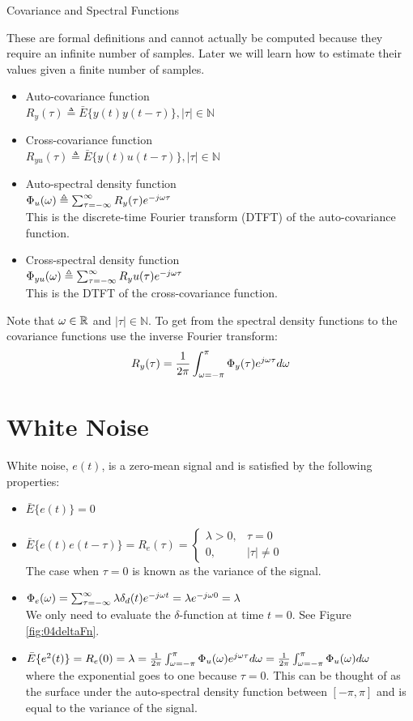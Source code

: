 \begin{definition}{Covariance and Spectral Functions}

These are formal definitions and cannot actually be computed because they require an infinite number of samples. Later we will learn how to estimate their values given a finite number of samples.
\begin{itemize}
\item Auto-covariance function \\
$R_y(\tau) \triangleq \bar{E}\{y(t)y(t-\tau)\}, |\tau|\in\mathbb{N}$
\item Cross-covariance function \\
$R_{yu}(\tau) \triangleq \bar{E}\{y(t)u(t-\tau)\}, |\tau|\in\mathbb{N}$
\item Auto-spectral density function \\
$\Phi_u(\omega) \triangleq \sum_{\tau=-\infty}^\infty R_y(\tau)e^{-j\omega\tau}$ \\
This is the discrete-time Fourier transform (DTFT) of the auto-covariance function.
\item Cross-spectral density function \\
$\Phi_{yu}(\omega) \triangleq \sum_{\tau=-\infty}^\infty R_yu(\tau)e^{-j\omega\tau}$ \\
This is the DTFT of the cross-covariance function.
\end{itemize}
Note that $\omega\in\mathbb{R}$ and $|\tau|\in\mathbb{N}$. To get from the spectral density functions to the covariance functions use the inverse Fourier transform:
$$R_y(\tau) = \frac{1}{2\pi}\int_{\omega=-\pi}^\pi \Phi_y(\tau)e^{j\omega\tau}d\omega$$
\end{definition}

\section{White Noise}
White noise, $e(t)$, is a zero-mean signal and is satisfied by the following properties:
\begin{itemize}
\item $\bar{E}\{e(t)\}=0$
\item $\bar{E}\{e(t)e(t-\tau)\} = R_e(\tau) = \begin{cases} \lambda>0, & \tau=0 \\ 0, & |\tau|\neq 0 \end{cases}$ \\
The case when $\tau=0$ is known as the variance of the signal.
\item $\Phi_e(\omega) = \sum_{\tau=-\infty}^\infty \lambda\delta_d(t)e^{-j\omega t} = \lambda e^{-j\omega 0} = \lambda$ \\
We only need to evaluate the $\delta$-function at time $t=0$. See Figure \ref{fig:04deltaFn}.
\item $\bar{E}\{e^2(t)\} = R_e(0) = \lambda = \frac{1}{2\pi}\int_{\omega=-\pi}^\pi\Phi_u(\omega)e^{j\omega\tau}d\omega = \frac{1}{2\pi} \int_{\omega=-\pi}^\pi\Phi_u(\omega)d\omega$ \\
where the exponential goes to one because $\tau=0$. This can be thought of as the surface under the auto-spectral density function between $[-\pi,\pi]$ and is equal to the variance of the signal.
\end{itemize}

